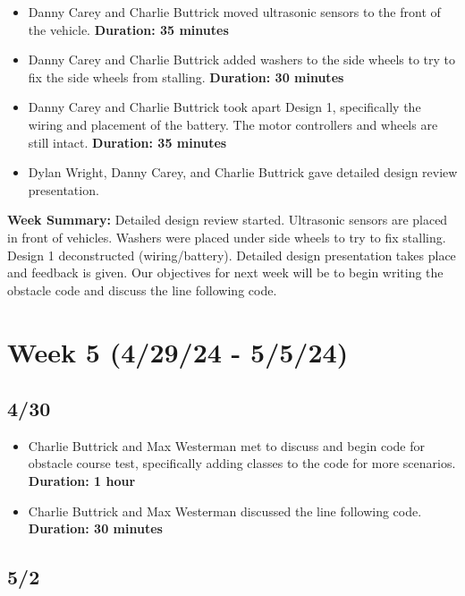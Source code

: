 \documentclass[12pt]{report}
\begin{document}
\begin{itemize}
    \item Danny Carey and Charlie Buttrick moved ultrasonic sensors to the front of the vehicle. \textbf{Duration: 35 minutes}
    \item Danny Carey and Charlie Buttrick added washers to the side wheels to try to fix the side wheels from stalling. \textbf{Duration: 30 minutes}
    \item Danny Carey and Charlie Buttrick took apart Design 1, specifically the wiring and placement of the battery. The motor controllers and wheels are still intact. \textbf{Duration: 35 minutes}
    \item Dylan Wright, Danny Carey, and Charlie Buttrick gave detailed design review presentation.
\end{itemize}

\textbf{Week Summary:} Detailed design review started. Ultrasonic sensors are placed in front of vehicles. Washers were placed under side wheels to try to fix stalling. Design 1 deconstructed (wiring/battery). Detailed design presentation takes place and feedback is given. Our objectives for next week will be to begin writing the obstacle code and discuss the line following code.

\section{Week 5 (4/29/24 - 5/5/24)}
\subsection*{4/30}

\begin{itemize}
    \item Charlie Buttrick and Max Westerman met to discuss and begin code for obstacle course test, specifically adding classes to the code for more scenarios. \textbf{Duration: 1 hour}
    \item Charlie Buttrick and Max Westerman discussed the line following code. \textbf{Duration: 30 minutes}
\end{itemize}

\subsection*{5/2}
\end{document}
